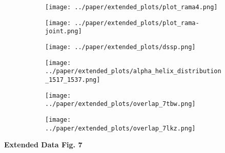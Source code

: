 \begin{figure}[H]
    \begin{subfigure}[t]{.6\textwidth}
        \caption{}
        \texttt{[image: ../paper/extended\_plots/plot\_rama4.png]}        
    \end{subfigure}
    \begin{subfigure}[t]{.4\textwidth}
        \caption{}
        \texttt{[image: ../paper/extended\_plots/plot\_rama-joint.png]}        
    \end{subfigure}
    \begin{subfigure}[t]{.5\textwidth}
        \caption{}
        \texttt{[image: ../paper/extended\_plots/dssp.png]}        
    \end{subfigure}
    \begin{subfigure}[t]{.45\textwidth}
        \caption{}
        \texttt{[image: ../paper/extended\_plots/alpha\_helix\_distribution\_1517\_1537.png]}        
    \end{subfigure}
    \begin{subfigure}[t]{.45\textwidth}
        \caption{}
        \texttt{[image: ../paper/extended\_plots/overlap\_7tbw.png]}        
    \end{subfigure}
    \begin{subfigure}[t]{.45\textwidth}
        \caption{}
        \texttt{[image: ../paper/extended\_plots/overlap\_7lkz.png]}        
    \end{subfigure}
    \end{figure}
\textbf{Extended Data Fig. 7}

